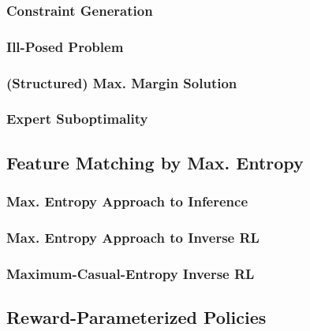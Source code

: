 			\subsubsection{Constraint Generation} %

			\subsubsection{Ill-Posed Problem} %

			\subsubsection{(Structured) Max. Margin Solution} %

			\subsubsection{Expert Suboptimality} %

		\subsection{Feature Matching by Max. Entropy} %

			\subsubsection{Max. Entropy Approach to Inference} %

			\subsubsection{Max. Entropy Approach to Inverse RL} %

			\subsubsection{Maximum-Casual-Entropy Inverse RL} %

		\subsection{Reward-Parameterized Policies} %

